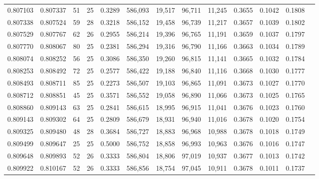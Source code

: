 \begin{tabular}{rrrrrrrrrrrrr}
0.807103 & 0.807337 &    51 &  25 &                                     0.3289 & 586,093 &  19,517 &  96,711 &  11,245 & 0.3655 & 0.1042 & 0.1808 \\
0.807338 & 0.807524 &    59 &  28 &                                     0.3218 & 586,152 &  19,458 &  96,739 &  11,217 & 0.3657 & 0.1039 & 0.1802 \\
0.807529 & 0.807767 &    62 &  26 &                                     0.2955 & 586,214 &  19,396 &  96,765 &  11,191 & 0.3659 & 0.1037 & 0.1797 \\
0.807770 & 0.808067 &    80 &  25 &                                     0.2381 & 586,294 &  19,316 &  96,790 &  11,166 & 0.3663 & 0.1034 & 0.1789 \\
0.808074 & 0.808252 &    56 &  25 &                                     0.3086 & 586,350 &  19,260 &  96,815 &  11,141 & 0.3665 & 0.1032 & 0.1784 \\
0.808253 & 0.808492 &    72 &  25 &                                     0.2577 & 586,422 &  19,188 &  96,840 &  11,116 & 0.3668 & 0.1030 & 0.1777 \\
0.808493 & 0.808711 &    85 &  25 &                                     0.2273 & 586,507 &  19,103 &  96,865 &  11,091 & 0.3673 & 0.1027 & 0.1770 \\
0.808712 & 0.808851 &    45 &  25 &                                     0.3571 & 586,552 &  19,058 &  96,890 &  11,066 & 0.3673 & 0.1025 & 0.1765 \\
0.808860 & 0.809143 &    63 &  25 &                                     0.2841 & 586,615 &  18,995 &  96,915 &  11,041 & 0.3676 & 0.1023 & 0.1760 \\
0.809143 & 0.809302 &    64 &  25 &                                     0.2809 & 586,679 &  18,931 &  96,940 &  11,016 & 0.3678 & 0.1020 & 0.1754 \\
0.809325 & 0.809480 &    48 &  28 &                                     0.3684 & 586,727 &  18,883 &  96,968 &  10,988 & 0.3678 & 0.1018 & 0.1749 \\
0.809499 & 0.809647 &    25 &  25 &                                     0.5000 & 586,752 &  18,858 &  96,993 &  10,963 & 0.3676 & 0.1016 & 0.1747 \\
0.809648 & 0.809893 &    52 &  26 &                                     0.3333 & 586,804 &  18,806 &  97,019 &  10,937 & 0.3677 & 0.1013 & 0.1742 \\
0.809922 & 0.810167 &    52 &  26 &                                     0.3333 & 586,856 &  18,754 &  97,045 &  10,911 & 0.3678 & 0.1011 & 0.1737 \\

\end{tabular}
